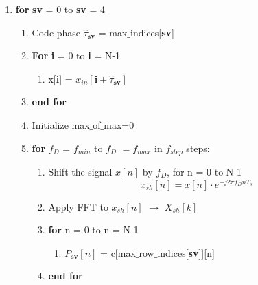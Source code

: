 \documentclass[journal,10pt,onecolumn]{article}
\begin{document}
\begin{enumerate}
    \item  \textbf{for} \textbf{sv} = 0  to \textbf{sv} = 4
    \begin{enumerate}
        \item[] Code phase $\hat{\tau}_{\textbf{sv}}$ = max$\_$indices[\textbf{sv}]
        \item[] \textbf{For} \textbf{i} = 0 to \textbf{i} = N-1
            \begin{enumerate}
                \item[]  x[\textbf{i}] = $x_{in}[\textbf{i}+\hat{\tau}_{\textbf{sv}}]$
            \end{enumerate}
            \item[] \textbf{end for}
            \item[] Initialize max$\_$of$\_$max=0
            \item[] \textbf{for} \textbf{$f_D$} = $f_{min}$ to \textbf{$f_D$} $= f_{max}$ in $f_{step}$ steps:
            \begin{enumerate}
                \item[] Shift the signal $x[n]$ by $f_D$, for n = 0 to N-1
                \begin{equation}
                    x_{sh}[n] = x[n]\cdot e ^{-j 2 \pi f_D n T_s} 
                \end{equation}
                \item[] Apply FFT to $x_{sh}[n]$ $\longrightarrow$ $X_{sh}[k]$
                \item[] \textbf{for} n = 0 to n = N-1
                \begin{enumerate}
                    \item[] $P_{\textbf{sv}}[n]$ = c[max$\_$row$\_$indices[\textbf{sv}]][n] 
                \end{enumerate}
                \item[] \textbf{end for}
                

\end{enumerate}
\end{enumerate}
\end{enumerate}
\end{document}
